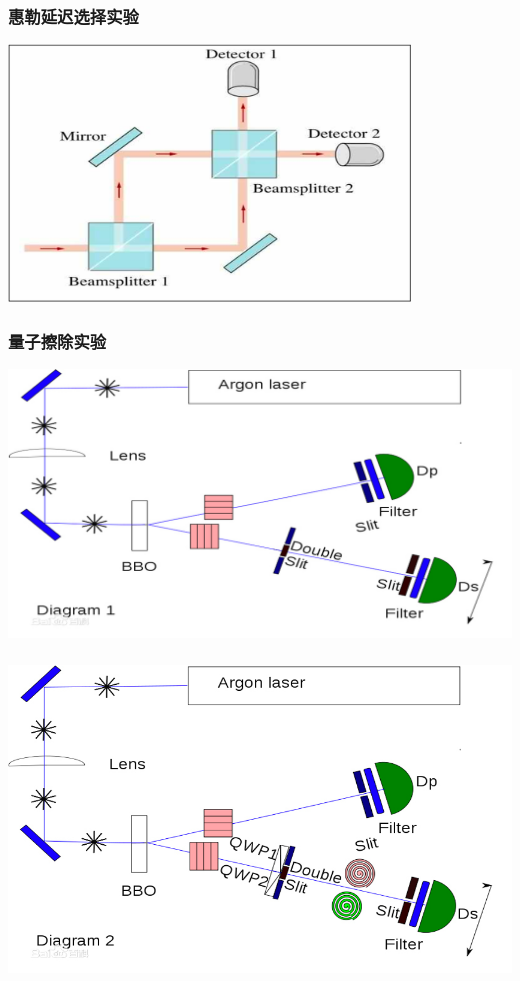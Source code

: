 \begin{frame}
    \frametitle{惠勒延迟选择实验}
    \begin{center}
        \includegraphics[width=0.8\textwidth]{figs/choose.png} \\
    \end{center} 
\end{frame}

\begin{frame}
    \frametitle{量子擦除实验}
    \begin{center}
        \includegraphics[width=1.0\textwidth]{figs/chachuexp.png} \\
    \end{center} 
\end{frame}

\begin{frame}
    \frametitle{}
    \begin{center}
        \includegraphics[width=1.0\textwidth]{figs/chachuexp_2.png} \\
    \end{center} 
\end{frame}

